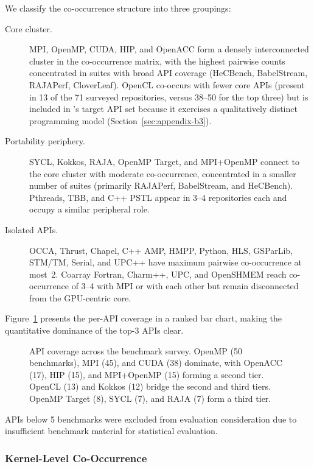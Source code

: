 We classify the co-occurrence structure into three groupings:
\begin{description}
\item[Core cluster.] MPI, OpenMP, CUDA, HIP, and OpenACC form a densely interconnected cluster in the co-occurrence matrix, with the highest pairwise counts concentrated in suites with broad API coverage (HeCBench, BabelStream, RAJAPerf, CloverLeaf). OpenCL co-occurs with fewer core APIs (present in 13 of the 71 surveyed repositories, versus 38--50 for the top three) but is included in \parbench{}'s target API set because it exercises a qualitatively distinct programming model (Section~\ref{sec:appendix-b3}).
\item[Portability periphery.] SYCL, Kokkos, RAJA, OpenMP Target, and MPI+OpenMP connect to the core cluster with moderate co-occurrence, concentrated in a smaller number of suites (primarily RAJAPerf, BabelStream, and HeCBench). Pthreads, TBB, and C++ PSTL appear in 3--4 repositories each and occupy a similar peripheral role.
\item[Isolated APIs.] OCCA, Thrust, Chapel, C++ AMP, HMPP, Python, HLS, GSParLib, STM/TM, Serial, and UPC++ have maximum pairwise co-occurrence at most~2. Coarray Fortran, Charm++, UPC, and OpenSHMEM reach co-occurrence of 3--4 with MPI or with each other but remain disconnected from the GPU-centric core.
\end{description}

Figure~\ref{fig:api-coverage} presents the per-API coverage in a ranked bar chart, making the quantitative dominance of the top-3 APIs clear.

\begin{figure}[htbp]
    \centering
    
    \caption{API coverage across the benchmark survey. OpenMP (50 benchmarks), MPI (45), and CUDA (38) dominate, with OpenACC (17), HIP (15), and MPI+OpenMP (15) forming a second tier. OpenCL (13) and Kokkos (12) bridge the second and third tiers. OpenMP Target (8), SYCL (7), and RAJA (7) form a third tier.}
    \label{fig:api-coverage}
\end{figure}

APIs below 5 benchmarks were excluded from evaluation consideration due to insufficient benchmark material for statistical evaluation.

\subsubsection*{Kernel-Level Co-Occurrence}

